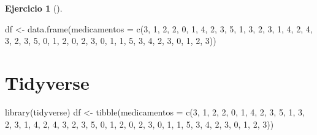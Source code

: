 \documentclass[
  a4paper,
]{scrreport}
\newenvironment{Shaded}{\begin{snugshade}}{\end{snugshade}}
\newcommand{\AttributeTok}[1]{\textcolor[rgb]{0.40,0.45,0.13}{#1}}
\newcommand{\DecValTok}[1]{\textcolor[rgb]{0.68,0.00,0.00}{#1}}
\newcommand{\FunctionTok}[1]{\textcolor[rgb]{0.28,0.35,0.67}{#1}}
\newcommand{\NormalTok}[1]{\textcolor[rgb]{0.00,0.23,0.31}{#1}}
\newcommand{\OtherTok}[1]{\textcolor[rgb]{0.00,0.23,0.31}{#1}}
\theoremstyle{definition}
\newtheorem{exercise}{Ejercicio}[chapter]
\theoremstyle{remark}
\begin{document}
\begin{exercise}[]
\begin{enumerate}
\begin{tcolorbox}
\begin{Shaded}
\begin{Highlighting}[]
\NormalTok{df }\OtherTok{\textless{}{-}} \FunctionTok{data.frame}\NormalTok{(}\AttributeTok{medicamentos =} \FunctionTok{c}\NormalTok{(}\DecValTok{3}\NormalTok{, }\DecValTok{1}\NormalTok{, }\DecValTok{2}\NormalTok{, }\DecValTok{2}\NormalTok{, }\DecValTok{0}\NormalTok{, }\DecValTok{1}\NormalTok{, }\DecValTok{4}\NormalTok{, }\DecValTok{2}\NormalTok{, }\DecValTok{3}\NormalTok{, }\DecValTok{5}\NormalTok{, }\DecValTok{1}\NormalTok{, }\DecValTok{3}\NormalTok{, }\DecValTok{2}\NormalTok{, }\DecValTok{3}\NormalTok{, }\DecValTok{1}\NormalTok{, }\DecValTok{4}\NormalTok{, }\DecValTok{2}\NormalTok{, }\DecValTok{4}\NormalTok{, }\DecValTok{3}\NormalTok{, }\DecValTok{2}\NormalTok{, }\DecValTok{3}\NormalTok{, }\DecValTok{5}\NormalTok{, }\DecValTok{0}\NormalTok{, }\DecValTok{1}\NormalTok{, }\DecValTok{2}\NormalTok{, }\DecValTok{0}\NormalTok{, }\DecValTok{2}\NormalTok{, }\DecValTok{3}\NormalTok{, }\DecValTok{0}\NormalTok{, }\DecValTok{1}\NormalTok{, }\DecValTok{1}\NormalTok{, }\DecValTok{5}\NormalTok{, }\DecValTok{3}\NormalTok{, }\DecValTok{4}\NormalTok{, }\DecValTok{2}\NormalTok{, }\DecValTok{3}\NormalTok{, }\DecValTok{0}\NormalTok{, }\DecValTok{1}\NormalTok{, }\DecValTok{2}\NormalTok{, }\DecValTok{3}\NormalTok{))}
\end{Highlighting}
\end{Shaded}

  \section{Tidyverse}

\begin{Shaded}
\begin{Highlighting}[]
\FunctionTok{library}\NormalTok{(tidyverse)}
\NormalTok{df }\OtherTok{\textless{}{-}} \FunctionTok{tibble}\NormalTok{(}\AttributeTok{medicamentos =} \FunctionTok{c}\NormalTok{(}\DecValTok{3}\NormalTok{, }\DecValTok{1}\NormalTok{, }\DecValTok{2}\NormalTok{, }\DecValTok{2}\NormalTok{, }\DecValTok{0}\NormalTok{, }\DecValTok{1}\NormalTok{, }\DecValTok{4}\NormalTok{, }\DecValTok{2}\NormalTok{, }\DecValTok{3}\NormalTok{, }\DecValTok{5}\NormalTok{, }\DecValTok{1}\NormalTok{, }\DecValTok{3}\NormalTok{, }\DecValTok{2}\NormalTok{, }\DecValTok{3}\NormalTok{, }\DecValTok{1}\NormalTok{, }\DecValTok{4}\NormalTok{, }\DecValTok{2}\NormalTok{, }\DecValTok{4}\NormalTok{, }\DecValTok{3}\NormalTok{, }\DecValTok{2}\NormalTok{, }\DecValTok{3}\NormalTok{, }\DecValTok{5}\NormalTok{, }\DecValTok{0}\NormalTok{, }\DecValTok{1}\NormalTok{, }\DecValTok{2}\NormalTok{, }\DecValTok{0}\NormalTok{, }\DecValTok{2}\NormalTok{, }\DecValTok{3}\NormalTok{, }\DecValTok{0}\NormalTok{, }\DecValTok{1}\NormalTok{, }\DecValTok{1}\NormalTok{, }\DecValTok{5}\NormalTok{, }\DecValTok{3}\NormalTok{, }\DecValTok{4}\NormalTok{, }\DecValTok{2}\NormalTok{, }\DecValTok{3}\NormalTok{, }\DecValTok{0}\NormalTok{, }\DecValTok{1}\NormalTok{, }\DecValTok{2}\NormalTok{, }\DecValTok{3}\NormalTok{))}
\end{Highlighting}
\end{Shaded}


\end{tcolorbox}
\end{enumerate}
\end{exercise}
\end{document}
